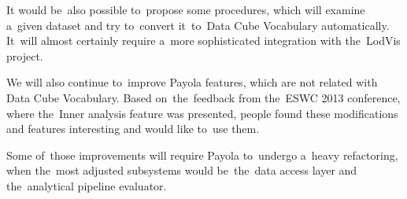 It would be~also possible to~propose some procedures, which will examine a~given 
dataset and try to~convert it~to~Data Cube Vocabulary automatically. It~will 
almost certainly require a~more sophisticated integration with the~LodVis 
project.

We will also continue to~improve Payola features, which are not related with 
Data Cube Vocabulary. Based on~the~feedback from the~ESWC 2013 conference, where the~Inner analysis feature was presented, people found these modifications and 
features interesting and would like to~use them.

Some of~those improvements will require Payola to~undergo a~heavy refactoring, 
when the~most adjusted subsystems would be~the~data access layer and the~analytical 
pipeline evaluator.

